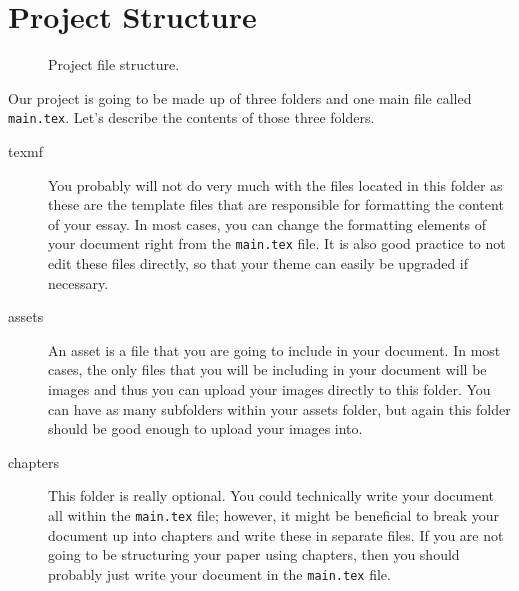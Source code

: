 \section{Project Structure}
\begin{figure}[h]

\caption{Project file structure.}
\end{figure}
Our project is going to be made up of three folders and one main file called
\texttt{main.tex}. Let's describe the contents of those three folders.
\begin{description}
  \item[texmf] You probably will not do very much with the files located
        in this folder as these are the template files that are responsible for
        formatting the content of your essay. In most cases, you can change
        the formatting elements of your document right from the
        \texttt{main.tex} file.  It is also good practice to not edit these
        files directly, so that your theme can easily be upgraded if necessary.
  \item[assets] An asset is a file that you are going to include in your
        document.  In most cases, the only files that you will be including
        in your document will be images and thus you can upload your images
        directly to this folder.  You can have as many subfolders within your
        assets folder, but again this folder should be good enough to upload
        your images into.
  \item[chapters] This folder is really optional.  You could technically write
        your document all within the \texttt{main.tex} file; however, it might
        be beneficial to break your document up into chapters and
        write these in separate files.  If you are not going to be structuring
        your paper using chapters, then you should probably just write your
        document in the \texttt{main.tex} file.
\end{description}

